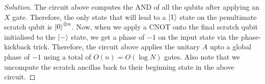 \begin{solution}[label=ques:2c]
\begin{proof}[Solution]
    The circuit above computes the AND of all the qubits after applying an $X$ gate. Therefore, the only state that will lead to a $\ket{1}$ state on the penultimate scratch qubit is $\ket{0}^{\otimes n}$. Now, when we apply a CNOT onto the final scratch qubit initialised to the $\ket{-}$ state, we get a phase of $-1$ on the input state via the phase-kickback trick. Therefore, the circuit above applies the unitary $A$ upto a global phase of $-1$ using a total of $O(n) = O(\log{N})$ gates. Also note that we uncompute the scratch ancillas back to their beginning state in the above circuit.
  \end{proof}
\end{solution}

